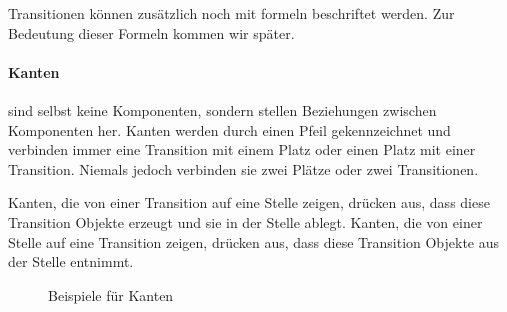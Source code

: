 Transitionen können zusätzlich noch mit formeln beschriftet werden. Zur Bedeutung dieser Formeln kommen wir später.

\paragraph{Kanten} sind selbst keine Komponenten, sondern stellen Beziehungen zwischen Komponenten her. Kanten werden durch einen Pfeil gekennzeichnet und verbinden immer eine Transition mit einem Platz oder einen Platz mit einer Transition. Niemals jedoch verbinden sie zwei Plätze oder zwei Transitionen.

Kanten, die von einer Transition auf eine Stelle zeigen, drücken aus, dass diese Transition Objekte erzeugt und sie in der Stelle ablegt. Kanten, die von einer Stelle auf eine Transition zeigen, drücken aus, dass diese Transition Objekte aus der Stelle entnimmt.

\begin{figure}[h]
	\centering
	\caption{Beispiele für Kanten}
	\label{fig:kanten}
\end{figure}

